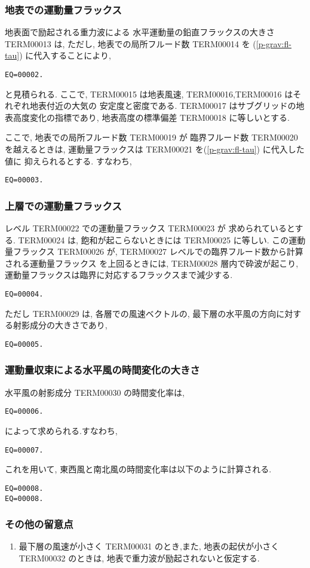 \subsubsection{地表での運動量フラックス}

地表面で励起される重力波による
水平運動量の鉛直フラックスの大きさ TERM00013 は,
ただし, 地表での局所フルード数 
TERM00014 を
(\ref{p-grav:fl-tau}) に代入することにより,
%
\begin{verbatim}
EQ=00002.
\end{verbatim}
%
と見積られる.
ここで, 
TERM00015 は地表風速,
TERM00016,TERM00016 はそれぞれ地表付近の大気の
安定度と密度である.
TERM00017 はサブグリッドの地表高度変化の指標であり,
地表高度の標準偏差 TERM00018 に等しいとする.

ここで, 地表での局所フルード数 
TERM00019 が 臨界フルード数
TERM00020 を越えるときは, 
運動量フラックスは TERM00021 を(\ref{p-grav:fl-tau}) に代入した値に
抑えられるとする.
すなわち,
\begin{verbatim}
EQ=00003.
\end{verbatim}

\subsubsection{上層での運動量フラックス}

レベル TERM00022 での運動量フラックス TERM00023 が
求められているとする.
TERM00024 は, 飽和が起こらないときには
TERM00025 に等しい.
この運動量フラックス TERM00026 が,
TERM00027 レベルでの臨界フルード数から計算される運動量フラックス
を上回るときには, TERM00028 層内で砕波が起こり,
運動量フラックスは臨界に対応するフラックスまで減少する.

\begin{verbatim}
EQ=00004.
\end{verbatim}

ただし TERM00029 は,
各層での風速ベクトルの,
最下層の水平風の方向に対する射影成分の大きさであり,
\begin{verbatim}
EQ=00005.
\end{verbatim}

\subsubsection{運動量収束による水平風の時間変化の大きさ}

水平風の射影成分 TERM00030 の時間変化率は,
\begin{verbatim}
EQ=00006.
\end{verbatim}
%
によって求められる.すなわち,
%
\begin{verbatim}
EQ=00007.
\end{verbatim}
%
これを用いて,
東西風と南北風の時間変化率は以下のように計算される.
\begin{verbatim}
EQ=00008.
EQ=00008.
\end{verbatim}

\subsubsection{その他の留意点}

\begin{enumerate}
\item 最下層の風速が小さく TERM00031 のとき,また,
      地表の起伏が小さく TERM00032 のときは, 
      地表で重力波が励起されないと仮定する.
\end{enumerate}

